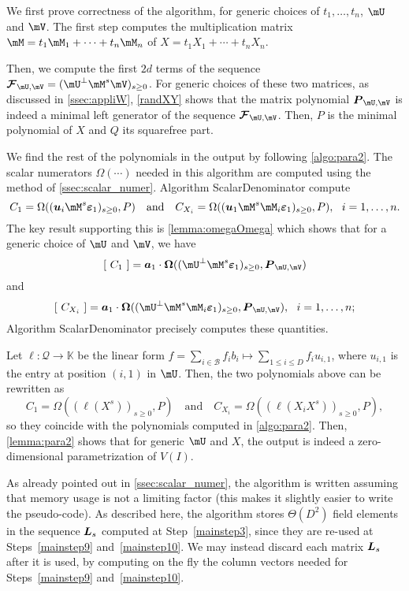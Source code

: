 \documentclass[12pt]{article}
\newcommand{\mat}[1]{\bm{\MakeUppercase{#1}}} %
\newcommand{\row}[1]{\bm{\MakeLowercase{#1}}} %
\newcommand{\col}[1]{\bm{\MakeLowercase{#1}}} %
\newcommand{\seq}{\mat{\mathcal{F}}} %
\newcommand{\basis}{\mathscr{B}}
\newcommand{\minpoly}{P}
\newcommand{\lf}{X}
\newcommand{\residueI}{\mathscr{Q}}
\newcommand{\sqfree}{Q}
\def\K{\mathbb{K}}
\def\K {\ensuremath{\mathbb{K}}}
\begin{document}
We first prove correctness of the algorithm, for generic choices of
$t_1,\dots,t_n$, $\mU$ and $\mV$. The first step computes the
multiplication matrix $\mM=t_1 \mM_1 + \cdots + t_n \mM_n$ of $\lf=t_1
X_1 + \cdots + t_n X_n$.

Then, we compute the first $2d$ terms of the sequence $\seq_{\mU,\mV}=
(\mU^{\perp}\mM^s\mV)_{s\ge 0}$. For generic choices of these two
matrices, as discussed in \cref{ssec:appliW}, \cref{randXY} shows that
the matrix polynomial $\mat{P}_{\mU,\mV}$ is indeed a minimal left
generator of the sequence $\seq_{\mU,\mV}$. Then, $\minpoly$ is the minimal 
polynomial of $\lf$ and $\sqfree$ its squarefree part.

We find the rest of the polynomials in the output by following
\cref{algo:para2}. The scalar numerators $\Omega(\cdots)$ needed in
this algorithm are computed using the method of
\cref{ssec:scalar_numer}. Algorithm ScalarDenominator
compute $$C_1 = \Omega((\row{u}_i \mM^s \col{\varepsilon}_1)_{s \ge 0}, \minpoly)
\quad\text{and}\quad
C_{X_i} = \Omega((\row{u}_1 \mM^s \mM_i \col{\varepsilon}_1)_{s \ge 0}, \minpoly),\ \ i=1,\dots,n.$$
The key result supporting this is \cref{lemma:omegaOmega} which shows
that for a generic choice of $\mU$ and $\mV$, we have 
$$[~C_1~] = \row{a}_1\cdot \mat{\Omega}((\mU^\perp \mM^s \col{\varepsilon}_1)_{s \ge 0}, \mat{P}_{\mU,\mV})$$
and
$$[~C_{X_i}~] = \row{a}_1\cdot \mat{\Omega}((\mU^\perp \mM^s \mM_i \col{\varepsilon}_1)_{s \ge 0}, \mat{P}_{\mU,\mV}),\ \ i=1,\dots,n;
$$
Algorithm ScalarDenominator precisely computes these quantities.

Let $\ell:\residueI \to \K$ be the linear form $f = \sum_{i \in \basis} f_i b_i \mapsto 
\sum_{1 \le i \le D} f_i u_{i,1}$, where $u_{i,1}$ is the entry at position
$(i,1)$ in $\mU$. Then, the two polynomials above can be rewritten
as 
$$C_1 = \Omega( (\ell(X^s))_{s \ge 0}, \minpoly) \quad\text{and}\quad
C_{X_i} = \Omega( (\ell(X_i X^s))_{s \ge 0}, \minpoly),$$ so they
coincide with the polynomials computed in \cref{algo:para2}.  Then,
\cref{lemma:para2} shows that for generic $\mU$ and $\lf$, the output
is indeed a zero-dimensional parametrization of $V(I)$.  

\begin{remark}
  As already pointed out in \cref{ssec:scalar_numer}, the algorithm is
  written assuming that memory usage is not a limiting factor (this
  makes it slightly easier to write the pseudo-code). As described
  here, the algorithm stores $\Theta(D^2)$ field elements in the
  sequence $\mat{L}_s$ computed at Step~\ref{mainstep3}, since they
  are re-used at Steps~\ref{mainstep9} and~\ref{mainstep10}.  We may
  instead discard each matrix $\mat{L}_s$ after it is used, by
  computing on the fly the column vectors needed for Steps~\ref{mainstep9}
  and~\ref{mainstep10}.
\end{remark}
\end{document}
